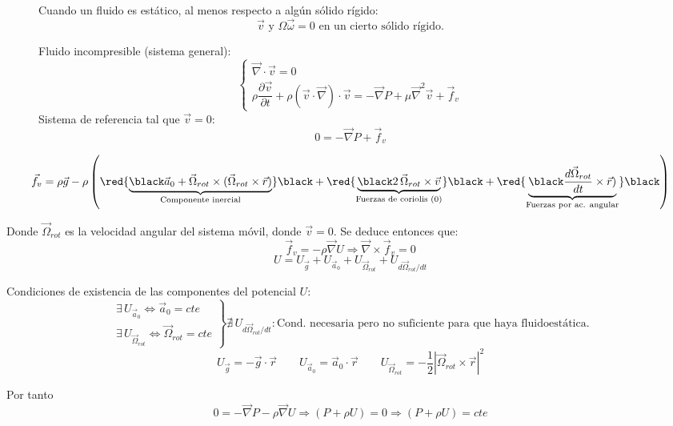 \begin{figure}[H]
\begin{minipage}{0.5\textwidth}
\begin{figure}[H]
				
			\end{figure}
		\end{minipage}
		\begin{minipage}{0.5\textwidth}
			Cuando un fluido es estático, al menos respecto a algún sólido rígido:
			\[\vec v \text{ y } \Omega \vec \omega = 0 \text{ en un cierto sólido rígido.}\]
			
			Fluido incompresible (sistema general):
			\[			
			\left\{
			\begin{matrix}
				\vec \nabla \cdot \vec v = 0\\
				\rho \dfrac{\partial \vec v}{\partial t} + \rho (\vec v \cdot \vec \nabla)\cdot \vec v = - \vec \nabla P + \mu \vec \nabla^2 \vec v + \vec f_v
			\end{matrix}
			\right.
			\]
			Sistema de referencia tal que $\vec v = 0$:
			\[0 = -\vec \nabla P + \vec f_v\]
		\end{minipage}
	\end{figure}

	
	
	\[\vec f_v = \rho \vec g 
	- \rho \left(
	\red{\underbrace{\black \vec a_0 + \vec \Omega_{rot} \times (\vec \Omega_{rot} \times \vec r)}_{\text{Componente inercial}}} \black
	+ 
	\red{\underbrace{\black 2\,\vec \Omega_{rot}\times \vec v}_{\text{Fuerzas de coriolis (0)}}} \black
	+ 
	\red{\underbrace{\black \dfrac{d\vec \Omega_{rot}}{dt}\times \vec r)}_{\text{Fuerzas por ac. angular}}} \black \right)
	\]
	
	
	Donde $\vec \Omega_{rot}$ es la velocidad angular del sistema móvil, donde $\vec v = 0$. Se deduce entonces que:
	\[\vec f_v = -\rho \vec \nabla U \Rightarrow \vec \nabla \times \vec f_v = 0\]
	\[U = U_{\vec g} + U_{\vec a_0} + U_{\vec \Omega_{rot}} + U_{d\vec \Omega_{rot}/dt}\]
	
	Condiciones de existencia de las componentes del potencial $U$:
	\[
	\left.
	\begin{matrix}
		\exists \, U_{\vec a_0} \Longleftrightarrow \vec a_0 = cte \\
		\exists \, U_{\vec \Omega_{rot}} \Longleftrightarrow \vec \Omega_{rot} = cte
	\end{matrix}
	\right\}
	\nexists \, U_{d\vec \Omega_{rot}/dt} : \text{Cond. necesaria pero no suficiente para que haya fluidoestática.}
	\]
	\[U_{\vec g} = -\vec g \cdot \vec r \qquad U_{\vec a_0} = \vec a_0 \cdot \vec r \qquad U_{\vec \Omega_{rot}}=-\dfrac{1}{2}\left|\vec \Omega_{rot}\times \vec r\right|^2\]
	
	
	Por tanto
	\[0 = -\vec \nabla P - \rho \vec \nabla U \Rightarrow (P + \rho U) = 0 \Rightarrow (P + \rho U) = cte\]
	
